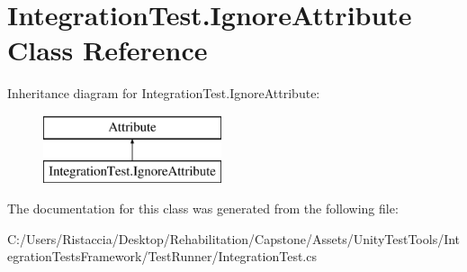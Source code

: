 \hypertarget{class_integration_test_1_1_ignore_attribute}{}\section{Integration\+Test.\+Ignore\+Attribute Class Reference}
\label{class_integration_test_1_1_ignore_attribute}
Inheritance diagram for Integration\+Test.\+Ignore\+Attribute\+:\begin{figure}[H]
\begin{center}
\leavevmode
\includegraphics[height=2.000000cm]{class_integration_test_1_1_ignore_attribute}
\end{center}
\end{figure}


The documentation for this class was generated from the following file\+:\begin{DoxyCompactItemize}
\item 
C\+:/\+Users/\+Ristaccia/\+Desktop/\+Rehabilitation/\+Capstone/\+Assets/\+Unity\+Test\+Tools/\+Integration\+Tests\+Framework/\+Test\+Runner/Integration\+Test.\+cs\end{DoxyCompactItemize}
